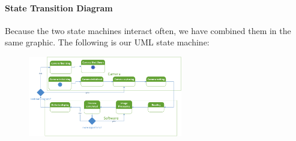 	\paragraph{State Transition Diagram}
	Because the two state machines interact often, we have combined them in the same graphic. The following is our UML state machine:\\
	\begin{figure}[!ht] 
		\centering
		\includegraphics[width=0.6\textwidth,natwidth=610,natheight=642]{images/StateTransition_Diagram.png}  
		\end{figure}

